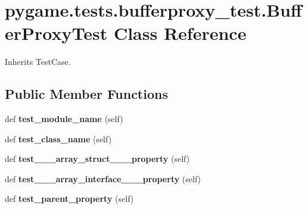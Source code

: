 \hypertarget{classpygame_1_1tests_1_1bufferproxy__test_1_1_buffer_proxy_test}{}\section{pygame.\+tests.\+bufferproxy\+\_\+test.\+Buffer\+Proxy\+Test Class Reference}
\label{classpygame_1_1tests_1_1bufferproxy__test_1_1_buffer_proxy_test}


Inherits Test\+Case.

\subsection*{Public Member Functions}
\begin{DoxyCompactItemize}
\item 
\mbox{\label{classpygame_1_1tests_1_1bufferproxy__test_1_1_buffer_proxy_test_a934bb3b02f183322b7dbff344c1482ef}} 
def {\bfseries test\+\_\+module\+\_\+name} (self)
\item 
\mbox{\label{classpygame_1_1tests_1_1bufferproxy__test_1_1_buffer_proxy_test_ac0f603bf208cd7ff2c0ecb7fed319e83}} 
def {\bfseries test\+\_\+class\+\_\+name} (self)
\item 
\mbox{\label{classpygame_1_1tests_1_1bufferproxy__test_1_1_buffer_proxy_test_a1b99aed520b59f28a4d349674d00dcf6}} 
def {\bfseries test\+\_\+\+\_\+\+\_\+array\+\_\+struct\+\_\+\+\_\+\+\_\+property} (self)
\item 
\mbox{\label{classpygame_1_1tests_1_1bufferproxy__test_1_1_buffer_proxy_test_aafb6dc5bcb538d712a4241c19680cd84}} 
def {\bfseries test\+\_\+\+\_\+\+\_\+array\+\_\+interface\+\_\+\+\_\+\+\_\+property} (self)
\item 
\mbox{\label{classpygame_1_1tests_1_1bufferproxy__test_1_1_buffer_proxy_test_a7b5730805a8efae699936145ff61f4ae}} 
def {\bfseries test\+\_\+parent\+\_\+property} (self)
\item 

\end{DoxyCompactItemize}
